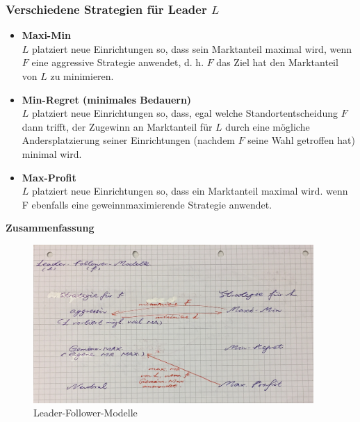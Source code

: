 
      \subsubsection{Verschiedene Strategien für Leader $L$} %
      \label{ssub:verschiedene_strategien_für_leader_}
      
        \begin{itemize}
          \item \textbf{Maxi-Min} \\
          $L$ platziert neue Einrichtungen so, dass sein Marktanteil maximal wird, wenn $F$ eine aggressive Strategie anwendet, d. h. $F$ das Ziel hat den Marktanteil von $L$ zu minimieren.

          \item \textbf{Min-Regret (minimales Bedauern)}\\
          $L$ platziert neue Einrichtungen so, dass, egal welche Standortentscheidung $F$ dann trifft, der Zugewinn an Marktanteil für $L$ durch eine mögliche Andersplatzierung seiner Einrichtungen (nachdem $F$ seine Wahl getroffen hat) minimal wird.

          \item \textbf{Max-Profit}\\
           $L$ platziert neue Einrichtungen so, dass ein Marktanteil maximal wird. wenn F ebenfalls eine geweinnmaximierende Strategie anwendet.
        \end{itemize}

        \textbf{Zusammenfassung}

        \begin{figure}[htbp]
          \centering
          \includegraphics[width=0.95\textwidth]{Images/Leader_Follower_Modelle.JPG}
          \caption{Leader-Follower-Modelle}
          \label{fig:Leader-Follower-Modelle}
        \end{figure}

